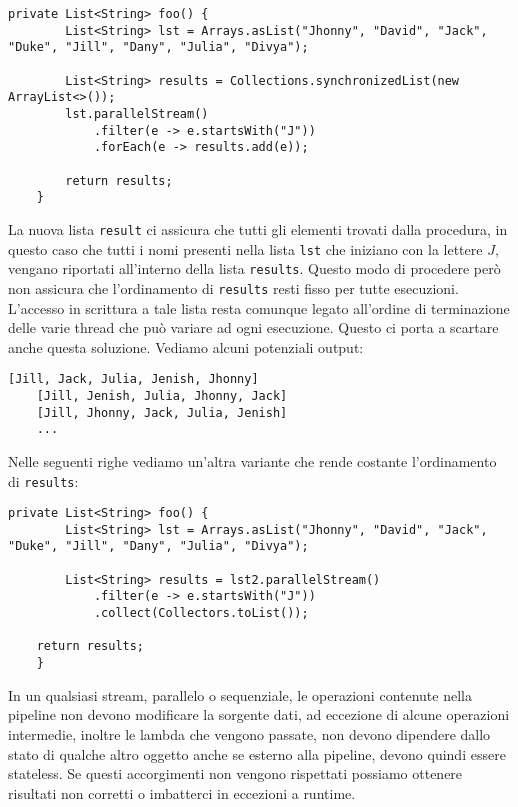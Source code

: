 			\begin{lstlisting}[breaklines=true]
	private List<String> foo() {
		List<String> lst = Arrays.asList("Jhonny", "David", "Jack", "Duke", "Jill", "Dany", "Julia", "Divya");
		
		List<String> results = Collections.synchronizedList(new ArrayList<>());
		lst.parallelStream()
			.filter(e -> e.startsWith("J"))
			.forEach(e -> results.add(e));
		
		return results;
	}
			\end{lstlisting}
			La nuova lista \lstinline|result| ci assicura che tutti gli elementi trovati dalla procedura, in questo caso che tutti i nomi presenti nella lista \lstinline|lst| che iniziano con la lettere $J$, vengano riportati all'interno della lista \lstinline|results|. Questo modo di procedere però non assicura che l'ordinamento di \lstinline|results| resti fisso per tutte esecuzioni. L'accesso in scrittura a tale lista resta comunque legato all'ordine di terminazione delle varie thread che può variare ad ogni esecuzione. Questo ci porta a scartare anche questa soluzione. Vediamo alcuni potenziali output:
			\begin{lstlisting}[numbers=none,frame=none]
	[Jill, Jack, Julia, Jenish, Jhonny]
	[Jill, Jenish, Julia, Jhonny, Jack]
	[Jill, Jhonny, Jack, Julia, Jenish]
	...
			\end{lstlisting}
			Nelle seguenti righe vediamo un'altra variante che rende costante l'ordinamento di \lstinline|results|:
			\begin{lstlisting}[breaklines=true]
	private List<String> foo() {
		List<String> lst = Arrays.asList("Jhonny", "David", "Jack", "Duke", "Jill", "Dany", "Julia", "Divya");
	
		List<String> results = lst2.parallelStream()
			.filter(e -> e.startsWith("J"))
			.collect(Collectors.toList());
	
	return results;
	}
			\end{lstlisting}
			In un qualsiasi stream, parallelo o sequenziale, le operazioni contenute nella pipeline non devono modificare la sorgente dati, ad eccezione di alcune operazioni intermedie, inoltre le lambda che vengono passate, non devono dipendere dallo stato di qualche altro oggetto anche se esterno alla pipeline, devono quindi essere stateless. Se questi accorgimenti non vengono rispettati possiamo ottenere risultati non corretti o imbatterci in eccezioni a runtime.